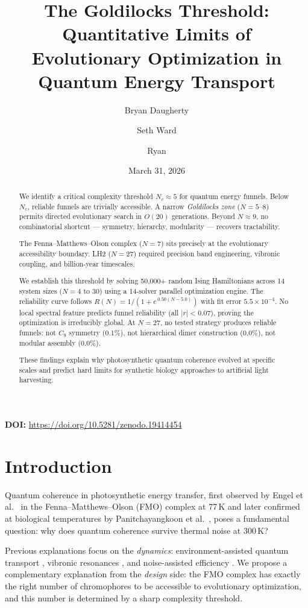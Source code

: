 \documentclass[11pt]{amsart}
\title[The Goldilocks Threshold]{The Goldilocks Threshold:\\Quantitative Limits of Evolutionary Optimization in Quantum Energy Transport}
\author{Bryan Daugherty}
\author{Seth Ward}
\author{Ryan}
\date{March 31, 2026}
\theoremstyle{definition}
\begin{document}
\begin{abstract}
We identify a critical complexity threshold $N_c \approx 5$ for quantum energy funnels. Below $N_c$, reliable funnels are trivially accessible. A narrow \emph{Goldilocks zone} ($N = 5$--$8$) permits directed evolutionary search in $O(20)$ generations. Beyond $N \approx 9$, no combinatorial shortcut --- symmetry, hierarchy, modularity --- recovers tractability.

The Fenna--Matthews--Olson complex ($N = 7$) sits precisely at the evolutionary accessibility boundary. LH2 ($N = 27$) required precision band engineering, vibronic coupling, and billion-year timescales.

We establish this threshold by solving 50{,}000+ random Ising Hamiltonians across 14 system sizes ($N = 4$ to $30$) using a 14-solver parallel optimization engine. The reliability curve follows $R(N) = 1/(1 + e^{\,0.50(N - 5.0)})$ with fit error $5.5 \times 10^{-4}$. No local spectral feature predicts funnel reliability (all $|r| < 0.07$), proving the optimization is irreducibly global. At $N = 27$, no tested strategy produces reliable funnels: not $C_9$ symmetry (0.1\%), not hierarchical dimer construction (0.0\%), not modular assembly (0.0\%).

These findings explain why photosynthetic quantum coherence evolved at specific scales and predict hard limits for synthetic biology approaches to artificial light harvesting.
\end{abstract}

\vspace{0.5em}
\noindent\textbf{DOI:} \url{https://doi.org/10.5281/zenodo.19414454}

\maketitle
\tableofcontents

\section{Introduction}

Quantum coherence in photosynthetic energy transfer, first observed by Engel et al.\ \cite{engel2007} in the Fenna--Matthews--Olson (FMO) complex at 77\,K and later confirmed at biological temperatures by Panitchayangkoon et al.\ \cite{panitchayangkoon2010}, poses a fundamental question: why does quantum coherence survive thermal noise at 300\,K?

Previous explanations focus on the \emph{dynamics}: environment-assisted quantum transport \cite{plenio2008}, vibronic resonances \cite{chin2013}, and noise-assisted efficiency \cite{cao2020}. We propose a complementary explanation from the \emph{design} side: the FMO complex has exactly the right number of chromophores to be accessible to evolutionary optimization, and this number is determined by a sharp complexity threshold.
\end{document}
